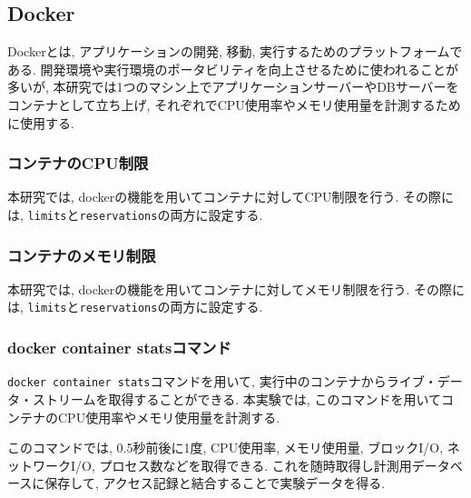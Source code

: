 \documentclass[../../../main]{subfiles}
\begin{document}
    \subsection{Docker}\label{subsec:phraseology-docker}

    Dockerとは, アプリケーションの開発, 移動, 実行するためのプラットフォームである. 開発環境や実行環境のポータビリティを向上させるために使われることが多いが, 本研究では1つのマシン上でアプリケーションサーバーやDBサーバーをコンテナとして立ち上げ, それぞれでCPU使用率やメモリ使用量を計測するために使用する. \cite{Docker概要}

    \subsubsection{コンテナのCPU制限}\label{subsubsec:phraseology-docker-cpu-limit}

    本研究では, dockerの機能を用いてコンテナに対してCPU制限を行う. その際には, \texttt{limits}と\texttt{reservations}の両方に設定する. \cite{Docker制限}

    \subsubsection{コンテナのメモリ制限}\label{subsubsec:phraseology-docker-memory-limit}

    本研究では, dockerの機能を用いてコンテナに対してメモリ制限を行う. その際には, \texttt{limits}と\texttt{reservations}の両方に設定する. \cite{Docker制限}

    \subsubsection{docker container statsコマンド}\label{subsubsec:phraseology-docker-container-stats}

    \texttt{docker container stats}コマンドを用いて, 実行中のコンテナからライブ・データ・ストリームを取得することができる. 本実験では, このコマンドを用いてコンテナのCPU使用率やメモリ使用量を計測する.

    このコマンドでは, 0.5秒前後に1度, CPU使用率, メモリ使用量, ブロックI/O, ネットワークI/O, プロセス数などを取得できる. これを随時取得し計測用データベースに保存して, アクセス記録と結合することで実験データを得る. \cite{Docker Stats}
\end{document}
